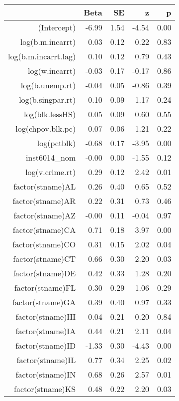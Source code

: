 \begin{table}[ht]
\centering
\begin{tabular}{rrrrr}
  \hline
 & Beta & SE & z & p \\ 
  \hline
(Intercept) & -6.99 & 1.54 & -4.54 & 0.00 \\ 
  log(b.m.incarrt) & 0.03 & 0.12 & 0.22 & 0.83 \\ 
  log(b.m.incarrt.lag) & 0.10 & 0.12 & 0.79 & 0.43 \\ 
  log(w.incarrt) & -0.03 & 0.17 & -0.17 & 0.86 \\ 
  log(b.unemp.rt) & -0.04 & 0.05 & -0.86 & 0.39 \\ 
  log(b.singpar.rt) & 0.10 & 0.09 & 1.17 & 0.24 \\ 
  log(blk.lessHS) & 0.05 & 0.09 & 0.60 & 0.55 \\ 
  log(chpov.blk.pc) & 0.07 & 0.06 & 1.21 & 0.22 \\ 
  log(pctblk) & -0.68 & 0.17 & -3.95 & 0.00 \\ 
  inst6014\_nom & -0.00 & 0.00 & -1.55 & 0.12 \\ 
  log(v.crime.rt) & 0.29 & 0.12 & 2.42 & 0.01 \\ 
  factor(stname)AL & 0.26 & 0.40 & 0.65 & 0.52 \\ 
  factor(stname)AR & 0.22 & 0.31 & 0.73 & 0.46 \\ 
  factor(stname)AZ & -0.00 & 0.11 & -0.04 & 0.97 \\ 
  factor(stname)CA & 0.71 & 0.18 & 3.97 & 0.00 \\ 
  factor(stname)CO & 0.31 & 0.15 & 2.02 & 0.04 \\ 
  factor(stname)CT & 0.66 & 0.30 & 2.20 & 0.03 \\ 
  factor(stname)DE & 0.42 & 0.33 & 1.28 & 0.20 \\ 
  factor(stname)FL & 0.30 & 0.29 & 1.06 & 0.29 \\ 
  factor(stname)GA & 0.39 & 0.40 & 0.97 & 0.33 \\ 
  factor(stname)HI & 0.04 & 0.21 & 0.20 & 0.84 \\ 
  factor(stname)IA & 0.44 & 0.21 & 2.11 & 0.04 \\ 
  factor(stname)ID & -1.33 & 0.30 & -4.43 & 0.00 \\ 
  factor(stname)IL & 0.77 & 0.34 & 2.25 & 0.02 \\ 
  factor(stname)IN & 0.68 & 0.26 & 2.57 & 0.01 \\ 
  factor(stname)KS & 0.48 & 0.22 & 2.20 & 0.03 \\ 

\end{tabular}
\end{table}
